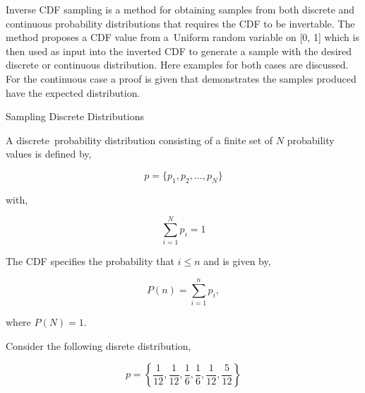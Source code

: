 \documentclass[12pt]{article}
\begin{document}
Inverse CDF sampling is a method for obtaining samples from both discrete and continuous probability distributions that requires the CDF to be invertable.
The method proposes a CDF value from a Uniform random variable on [0, 1] which is then used as input into the inverted CDF to generate a sample
with the desired discrete or continuous distribution. Here examples for both cases are discussed.
For the continuous case a proof is given that demonstrates the samples produced have the expected distribution.

Sampling Discrete Distributions

A discrete probability distribution consisting of a finite set of $N$ probability values is defined by,

$$p=\{ p_1, p_2,\ldots,p_N\}$$

with,

$$\sum_{i=1}^N{p_i} = 1$$

The CDF specifies the probability that $i \leq n$ and is given by,

\begin{equation} \label{eq:discrete_cdf}
P(n)=\sum_{i=1}^n{p_i},
\end{equation}

where $P(N)=1$.

Consider the following disrete distribution,

\begin{equation} \label{eq:discrete}
p =\left \{\frac{1}{12}, \frac{1}{12}, \frac{1}{6}, \frac{1}{6}, \frac{1}{12}, \frac{5}{12} \right\}
\end{equation}
\end{document}
